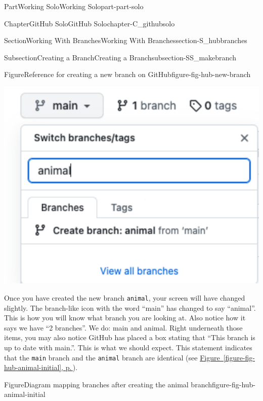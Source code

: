 \documentclass[twoside,10pt,]{book}
\newcommand{\xreffont}{\relax}
\newcommand{\mono}[1]{\texttt{#1}}
\begin{document}
\begin{partptx}{Part}{Working Solo}{}{Working Solo}{}{}{part-part-solo}
\begin{chapterptx}{Chapter}{GitHub Solo}{}{GitHub Solo}{}{}{chapter-C_githubsolo}
\begin{sectionptx}{Section}{Working With Branches}{}{Working With Branches}{}{}{section-S_hubbranches}
\begin{subsectionptx}{Subsection}{Creating a Branch}{}{Creating a Branch}{}{}{subsection-SS_makebranch}
\begin{figureptx}{Figure}{Reference for creating a new branch on GitHub}{figure-fig-hub-new-branch}{}
\begin{sidebyside}{2}{0}{0}{0}
\begin{sbspanel}{0.5}
\includegraphics[width=\linewidth]{external/hub_new_branch_animal.pdf}
\end{sbspanel}%
\end{sidebyside}%
\tcblower
\end{figureptx}%
Once you have created the new branch \mono{animal}, your screen will have changed slightly. The branch-like icon with the word ``main'' has changed to say ``animal''. This is how you will know what branch you are looking at. Also notice how it says we have ``2 branches''. We do: main and animal. Right underneath those items, you may also notice GitHub has placed a box stating that ``This branch is up to date with main.''. This is what we should expect. This statement indicates that the \mono{main} branch and the \mono{animal} branch are identical (see \hyperref[figure-fig-hub-animal-initial]{Figure~{\xreffont\ref{figure-fig-hub-animal-initial}}, p.\,\pageref{figure-fig-hub-animal-initial}}).%
\begin{figureptx}{Figure}{Diagram mapping branches after creating the animal branch}{figure-fig-hub-animal-initial}{}%
\begin{image}{0.15}{0.7}{0.15}{}%

\end{image}
\end{figureptx}
\end{subsectionptx}
\end{sectionptx}
\end{chapterptx}
\end{partptx}
\end{document}
